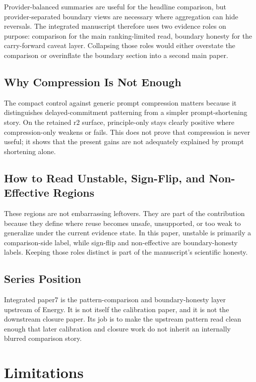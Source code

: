 \documentclass[11pt,a4paper]{article}
\begin{document}
Provider-balanced summaries are useful for the headline comparison, but provider-separated boundary views are necessary where aggregation can hide reversals. The integrated manuscript therefore uses two evidence roles on purpose: comparison for the main ranking-limited read, boundary honesty for the carry-forward caveat layer. Collapsing those roles would either overstate the comparison or overinflate the boundary section into a second main paper.

\subsection{Why Compression Is Not Enough}

The compact control against generic prompt compression matters because it distinguishes delayed-commitment patterning from a simpler prompt-shortening story. On the retained r2 surface, principle-only stays clearly positive where compression-only weakens or fails. This does not prove that compression is never useful; it shows that the present gains are not adequately explained by prompt shortening alone.

\subsection{How to Read Unstable, Sign-Flip, and Non-Effective Regions}

These regions are not embarrassing leftovers. They are part of the contribution because they define where reuse becomes unsafe, unsupported, or too weak to generalize under the current evidence state. In this paper, unstable is primarily a comparison-side label, while sign-flip and non-effective are boundary-honesty labels. Keeping those roles distinct is part of the manuscript's scientific honesty.

\subsection{Series Position}

Integrated paper7 is the pattern-comparison and boundary-honesty layer upstream of Energy. It is not itself the calibration paper, and it is not the downstream closure paper. Its job is to make the upstream pattern read clean enough that later calibration and closure work do not inherit an internally blurred comparison story.

\section{Limitations}
\label{sec:limitations}
\end{document}
